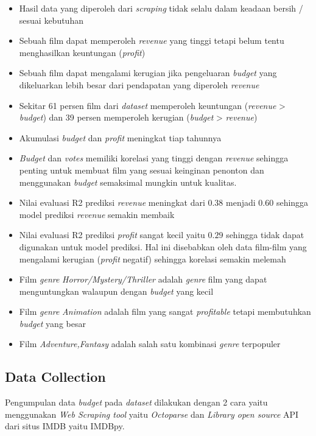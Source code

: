 \begin{itemize}
\item Hasil data yang diperoleh dari \textit{scraping} tidak selalu dalam keadaan bersih / sesuai kebutuhan
\item Sebuah film dapat memperoleh \textit{revenue} yang tinggi tetapi belum tentu menghasilkan keuntungan (\textit{profit})
\item Sebuah film dapat mengalami kerugian jika pengeluaran \textit{budget} yang dikeluarkan lebih besar dari pendapatan yang diperoleh \textit{revenue} 
\item Sekitar 61 persen film dari \textit{dataset} memperoleh keuntungan (\textit{revenue} > \textit{budget}) dan 39 persen memperoleh kerugian (\textit{budget} > \textit{revenue})
\item Akumulasi \textit{budget} dan \textit{profit} meningkat tiap tahunnya
\item \textit{Budget} dan \textit{votes} memiliki korelasi yang tinggi dengan \textit{revenue} sehingga penting untuk membuat film yang sesuai keinginan penonton dan menggunakan \textit{budget} semaksimal mungkin untuk kualitas.
\item Nilai evaluasi R2 prediksi \textit{revenue} meningkat dari  $0.38$ menjadi $0.60$ sehingga model  prediksi \textit{revenue} semakin membaik 
\item Nilai evaluasi R2 prediksi \textit{profit} sangat kecil yaitu $0.29$ sehingga tidak dapat digunakan untuk model prediksi. Hal ini disebabkan oleh data film-film yang mengalami kerugian (\textit{profit} negatif) sehingga korelasi semakin melemah 
 \item Film \textit{genre} \textit{Horror/Mystery/Thriller} adalah \textit{genre} film yang dapat menguntungkan walaupun dengan \textit{budget} yang kecil 
\item Film \textit{genre} \textit{Animation} adalah film yang sangat \textit{profitable} tetapi membutuhkan \textit{budget} yang besar 
\item Film \textit{Adventure,Fantasy} adalah salah satu kombinasi \textit{genre} terpopuler
\end{itemize}


\subsection{Data Collection} 
Pengumpulan data \textit{budget} pada \textit{dataset} dilakukan dengan 2 cara yaitu menggunakan \textit{Web Scraping tool} yaitu \textit{Octoparse} dan \textit{Library open source} API dari situs IMDB yaitu IMDBpy. 

